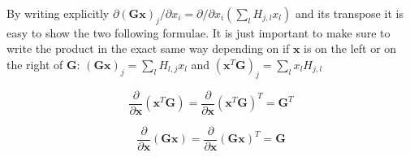 \documentclass[12pt]{article}
\newcommand{\G}{\mathbf{G}}
\newcommand{\x}{\mathbf{x}}
\newcommand{\ddx}{\frac{\partial}{\partial \mathbf{x}}}
\begin{document}
By writing explicitly $\partial (\G \x)_{j} / \partial x_{i}
= \partial/\partial x_{i} \left( \sum_{l} H_{j,l} x_{l}\right)$ and its transpose
it is easy to show the two following formulae. It is just important to make sure
to write the product in the exact same way depending on if $\x$ is on the left
or on the right of $\G$: $\left( \G \x \right)_{j} =  \sum_{l} H_{l,j} x_{l}$
and $\left( \x^{T} \G \right)_{j} =  \sum_{l} x_{l} H_{j,l}$

\begin{equation}
  \label{eq:3}
  \ddx \left( \x^{T} \G \right) = \ddx \left( \x^{T} \G \right)^{T} = \G^{T}
\end{equation}

\begin{equation}
  \label{eq:4}
  \ddx \left( \G \x \right) =  \ddx \left( \G \x \right)^{T} = \G
\end{equation}
\end{document}
